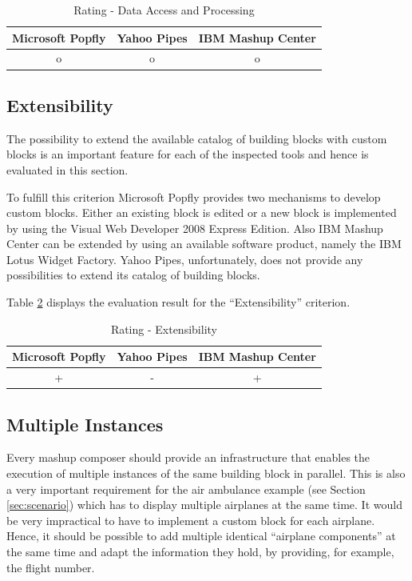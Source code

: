 \begin{table}[h]
	\centering
		\begin{tabular}{|c|c|c|}
			\hline
				 \textbf{Microsoft Popfly} & \textbf{Yahoo Pipes} & \textbf{IBM Mashup Center}\\
				\hline\hline
				o & o & o\\
			\hline
		\end{tabular}
	\caption{Rating - Data Access and Processing}
	\label{tab:RatingDataAccessAndAggregation}
\end{table}

\subsection{Extensibility}

The possibility to extend the available catalog of building blocks with custom blocks is an
important feature for each of the inspected tools and hence is evaluated in this section.

To fulfill this criterion Microsoft Popfly provides two mechanisms to develop custom blocks. Either
an existing block is edited or a new block is implemented by using the Visual Web Developer 2008
Express Edition. Also IBM Mashup Center can be extended by using an available software product,
namely the IBM Lotus Widget Factory. Yahoo Pipes, unfortunately, does not provide any possibilities
to extend its catalog of building blocks.

Table \ref{tab:Extensibility} displays the evaluation result for the ``Extensibility'' criterion.

\begin{table}[h]
	\centering
		\begin{tabular}{|c|c|c|}
			\hline
				\textbf{Microsoft Popfly} & \textbf{Yahoo Pipes} & \textbf{IBM Mashup Center}\\
				\hline\hline
				+ & - & +\\
			\hline
		\end{tabular}
	\caption{Rating - Extensibility}
	\label{tab:Extensibility}
\end{table}

\subsection{Multiple Instances}
\label{sec:multiple_instances}

Every mashup composer should provide an infrastructure that enables the execution of multiple
instances of the same building block in parallel. This is also a very important requirement for the
air ambulance example (see Section \ref{sec:scenario}) which has to display multiple airplanes at
the same time. It would be very impractical to have to implement a custom block for each airplane.
Hence, it should be possible to add multiple identical ``airplane components'' at the same time and
adapt the information they hold, by providing, for example, the flight number.

